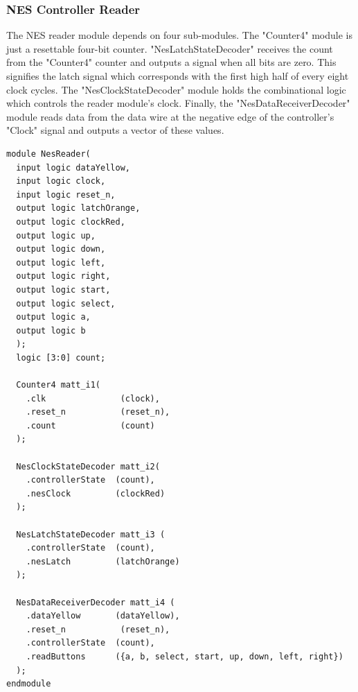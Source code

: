 \documentclass[a4paper]{article}
\begin{document}
\subsubsection{NES Controller Reader}
The NES reader module depends on four sub-modules. 
The "Counter4" module is just a resettable four-bit counter.
"NesLatchStateDecoder" receives the count from the "Counter4" counter and outputs a signal when all bits are zero. This signifies the latch signal which corresponds with the first high half of every eight clock cycles.
The "NesClockStateDecoder" module holds the combinational logic which controls the reader module's clock. 
Finally, the "NesDataReceiverDecoder" module reads data from the data wire at the negative edge of the controller's "Clock" signal and outputs a vector of these values. 


\begin{Verbatim}[tabsize = 4]
module NesReader(
  input logic dataYellow,
  input logic clock,
  input logic reset_n,
  output logic latchOrange,
  output logic clockRed,
  output logic up,
  output logic down,
  output logic left,
  output logic right,
  output logic start,
  output logic select,
  output logic a,
  output logic b
  );
  logic [3:0] count;

  Counter4 matt_i1(
    .clk               (clock), 
    .reset_n           (reset_n), 
    .count             (count)
  );

  NesClockStateDecoder matt_i2(
    .controllerState  (count), 
    .nesClock         (clockRed)
  );

  NesLatchStateDecoder matt_i3 (
    .controllerState  (count), 
    .nesLatch         (latchOrange)
  );

  NesDataReceiverDecoder matt_i4 (
    .dataYellow       (dataYellow), 
    .reset_n           (reset_n),
    .controllerState  (count), 
    .readButtons      ({a, b, select, start, up, down, left, right})
  );
endmodule

\end{Verbatim}
\end{document}
